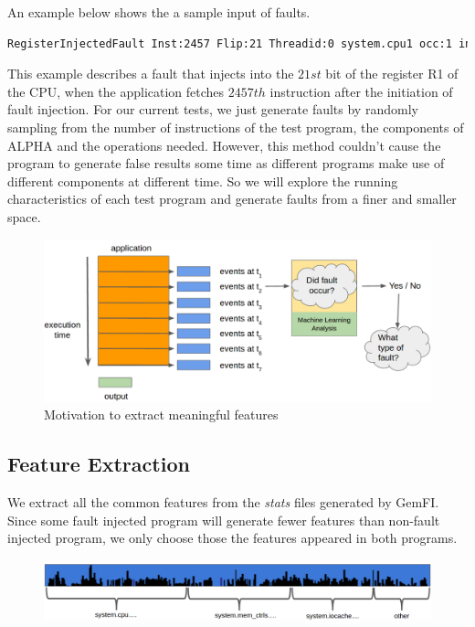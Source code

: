 An example below shows the a sample input of faults. 
\begin{lstlisting}[language=bash]
RegisterInjectedFault Inst:2457 Flip:21 Threadid:0 system.cpu1 occ:1 int 1
\end{lstlisting}

This example describes a fault that injects into the $21st$ bit of the register R1 of the CPU, when the application fetches $2457th$ instruction after the initiation of fault injection. For our current tests, we just generate faults by randomly sampling from the number of instructions of the test program, the components of ALPHA and the operations needed. However, this method couldn't cause the program to generate false results some time as different programs make use of different components at different time. So we will explore the running characteristics of each test program and generate faults from a finer and smaller space. 

\begin{figure}[t]
\begin{center}
   \includegraphics[width=0.95\linewidth]{./figures/teaser.png}
\end{center}
   \caption{Motivation to extract meaningful features}
\label{fig:teaser}
\end{figure}

\subsection{Feature Extraction}
We extract all the common features from the \emph{stats} files generated by GemFI. Since some fault injected program will generate fewer features than non-fault injected program, we only choose those the features appeared in both programs.
\begin{figure}[t]
\begin{center}
   \includegraphics[width=0.95\linewidth]{./figures/feat_dist.png}
\end{center}
   \caption{}
\label{fig:feat-dist}
\end{figure}


